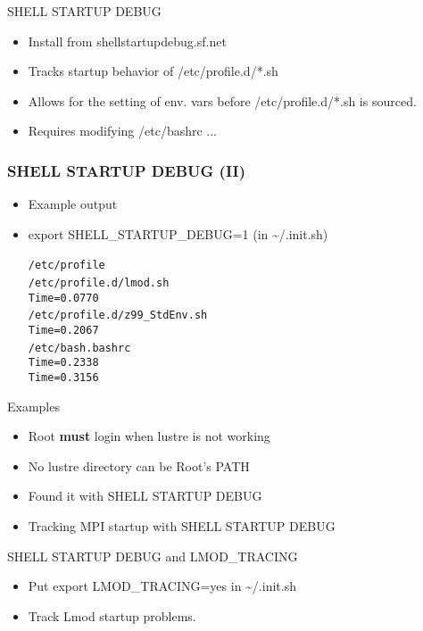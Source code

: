 \documentclass[dvipsnames,aspectratio=169]{beamer}
\begin{document}
\begin{frame}{SHELL STARTUP DEBUG}
  \begin{itemize}
    \item Install from shellstartupdebug.sf.net
    \item Tracks startup behavior of /etc/profile.d/*.sh
    \item Allows for the setting of env. vars before
      /etc/profile.d/*.sh is sourced.
    \item Requires modifying /etc/bashrc ...
  \end{itemize}
\end{frame}

\begin{frame}[fragile]
    \frametitle{SHELL STARTUP DEBUG (II)}
  \begin{itemize}
    \item Example output
    \item export SHELL\_STARTUP\_DEBUG=1 (in \textasciitilde/.init.sh)
  {\small
    \begin{alltt}
   /etc/profile{
      /etc/profile.d/lmod.sh{
      } Time = 0.0770
      /etc/profile.d/z99\_StdEnv.sh{
      } Time = 0.2067
      /etc/bash.bashrc{
      } Time = 0.2338
    } Time = 0.3156
    \end{alltt}
}
  \end{itemize}
\end{frame}

\begin{frame}{Examples}
  \begin{itemize}
    \item Root \textbf{must} login when lustre is not working
    \item No lustre directory can be Root's PATH
    \item Found it with SHELL STARTUP DEBUG
    \item Tracking MPI startup with SHELL STARTUP DEBUG
  \end{itemize}
\end{frame}

\begin{frame}{SHELL STARTUP DEBUG and LMOD\_TRACING}
  \begin{itemize}
    \item Put export LMOD\_TRACING=yes in \textasciitilde/.init.sh
    \item Track Lmod startup problems.
  \end{itemize}
\end{frame}
\end{document}
